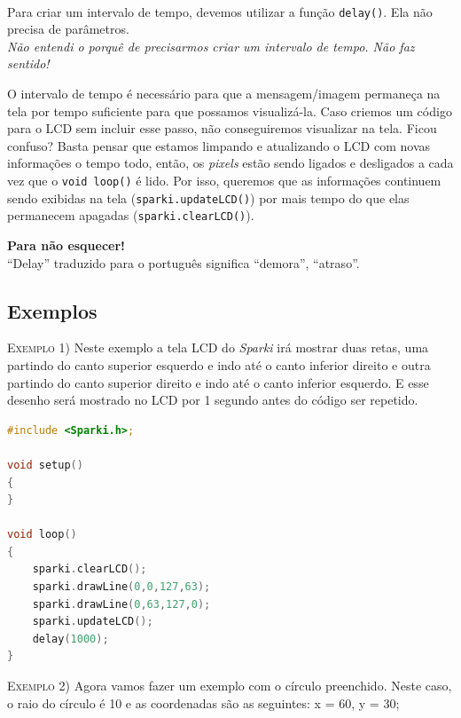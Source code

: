 \paragraph{}
Para criar um intervalo de tempo, devemos utilizar a função \lstinline[columns=fixed]{delay()}. Ela não precisa de parâmetros.\\

\textit{Não entendi o porquê de precisarmos criar um intervalo de tempo. Não faz sentido!} \par
O intervalo de tempo é necessário para que a mensagem/imagem permaneça na tela por tempo suficiente para que possamos visualizá-la. Caso criemos um código para o LCD sem incluir esse passo, não conseguiremos visualizar na tela. Ficou confuso? Basta pensar que estamos limpando e atualizando o LCD com novas informações o tempo todo, então, os \textit{pixels} estão sendo ligados e desligados a cada vez que o \lstinline[columns=fixed]{void loop()} é lido. Por isso, queremos que as informações continuem sendo exibidas na tela (\lstinline[columns=fixed]{sparki.updateLCD()}) por mais tempo do que elas permanecem apagadas (\lstinline[columns=fixed]{sparki.clearLCD()}).

\begin{center}
    \textcolor{mydarkblue}{\textbf{Para não esquecer!}} 
    \\ ``Delay'' traduzido para o português significa ``demora'', ``atraso''.
\end{center}

\subsection{Exemplos}
\textsc{Exemplo 1)} Neste exemplo a tela LCD do \textit{Sparki} irá mostrar duas retas, uma partindo do canto superior esquerdo e indo até o canto inferior direito e outra partindo do canto superior direito e indo até o canto inferior esquerdo. E esse desenho será mostrado no LCD por 1 segundo antes do código ser repetido.

\begin{lstlisting}[language=C]
#include <Sparki.h>;

void setup()
{
}

void loop()
{
    sparki.clearLCD();
    sparki.drawLine(0,0,127,63);
    sparki.drawLine(0,63,127,0);        
    sparki.updateLCD();
    delay(1000);  
}
\end{lstlisting}

\textsc{Exemplo 2)} Agora vamos fazer um exemplo com o círculo preenchido. Neste caso, o raio do círculo é 10 e as coordenadas são as seguintes: x = 60, y = 30;

